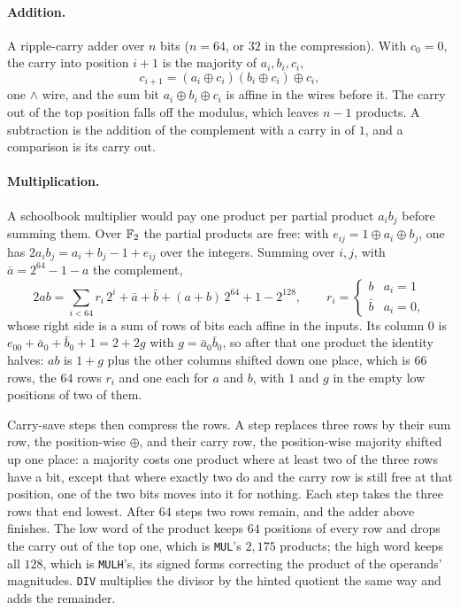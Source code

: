 \paragraph{Addition.} A ripple-carry adder over $n$ bits ($n=64$, or $32$ in the compression). With $c_0=0$, the carry into position $i+1$ is the majority of $a_i,b_i,c_i$,
\[
c_{i+1}=(a_i\oplus c_i)(b_i\oplus c_i)\oplus c_i ,
\]
one $\wedge$ wire, and the sum bit $a_i\oplus b_i\oplus c_i$ is affine in the wires before it. The carry out of the top position falls off the modulus, which leaves $n-1$ products. A subtraction is the addition of the complement with a carry in of $1$, and a comparison is its carry out.

\paragraph{Multiplication.} A schoolbook multiplier would pay one product per partial product $a_ib_j$ before summing them. Over $\mathbb{F}_2$ the partial products are free: with $e_{ij}=1\oplus a_i\oplus b_j$, one has $2a_ib_j=a_i+b_j-1+e_{ij}$ over the integers. Summing over $i,j$, with $\bar a=2^{64}-1-a$ the complement,
\[
2ab=\sum_{i<64}r_i\,2^{i}+\bar a+\bar b+(a+b)\,2^{64}+1-2^{128},\qquad r_i=\begin{cases}b&a_i=1\\ \bar b&a_i=0,\end{cases}
\]
whose right side is a sum of rows of bits each affine in the inputs. Its column $0$ is $e_{00}+\bar a_0+\bar b_0+1=2+2g$ with $g=\bar a_0\bar b_0$, so after that one product the identity halves: $ab$ is $1+g$ plus the other columns shifted down one place, which is $66$ rows, the $64$ rows $r_i$ and one each for $a$ and $b$, with $1$ and $g$ in the empty low positions of two of them.

Carry-save steps then compress the rows. A step replaces three rows by their sum row, the position-wise $\oplus$, and their carry row, the position-wise majority shifted up one place: a majority costs one product where at least two of the three rows have a bit, except that where exactly two do and the carry row is still free at that position, one of the two bits moves into it for nothing. Each step takes the three rows that end lowest. After $64$ steps two rows remain, and the adder above finishes. The low word of the product keeps $64$ positions of every row and drops the carry out of the top one, which is \texttt{MUL}'s $2{,}175$ products; the high word keeps all $128$, which is \texttt{MULH}'s, its signed forms correcting the product of the operands' magnitudes. \texttt{DIV} multiplies the divisor by the hinted quotient the same way and adds the remainder.

